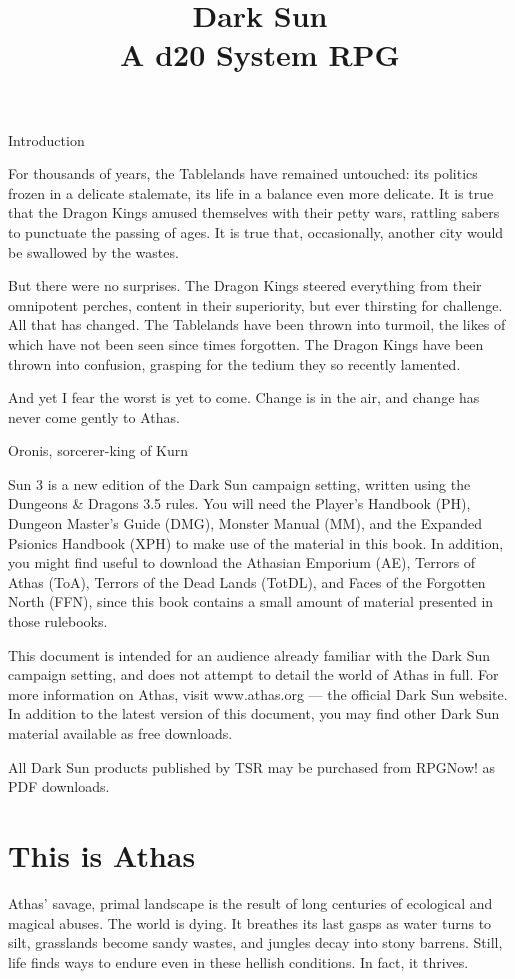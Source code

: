 \documentclass[10pt,a4paper,twocolumn]{d20}
\title{Dark Sun\\
  \large A d20 System RPG}
\begin{document}
\tableofcontents

\Chapter
{Introduction}
{For thousands of years, the Tablelands have remained untouched: its politics frozen in a delicate stalemate, its life in a balance even more delicate. It is true that the Dragon Kings amused themselves with their petty wars, rattling sabers to punctuate the passing of ages. It is true that, occasionally, another city would be swallowed by the wastes.

But there were no surprises. The Dragon Kings steered everything from their omnipotent perches, content in their superiority, but ever thirsting for challenge. All that has changed. The Tablelands have been thrown into turmoil, the likes of which have not been seen since times forgotten. The Dragon Kings have been thrown into confusion, grasping for the tedium they so recently lamented.

And yet I fear the worst is yet to come. Change is in the air, and change has never come gently to Athas.}{Oronis, sorcerer-king of Kurn}

 Sun 3 is a new edition of the Dark Sun campaign setting, written using the Dungeons \& Dragons 3.5 rules. You will need the Player’s Handbook (PH), Dungeon Master’s Guide (DMG), Monster Manual (MM), and the Expanded Psionics Handbook (XPH) to make use of the material in this book. In addition, you might find useful to download the Athasian Emporium (AE), Terrors of Athas (ToA), Terrors of the Dead Lands (TotDL), and Faces of the Forgotten North (FFN), since this book contains a small amount of material presented in those rulebooks.

This document is intended for an audience already familiar with the Dark Sun campaign setting, and does not attempt to detail the world of Athas in full. For more information on Athas, visit www.athas.org --- the official Dark Sun website. In addition to the latest version of this document, you may find other Dark Sun material available as free downloads.

All Dark Sun products published by TSR may be purchased from RPGNow! as PDF downloads.

\section{This is Athas}

Athas’ savage, primal landscape is the result of long centuries of ecological and magical abuses. The world is dying. It breathes its last gasps as water turns to silt, grasslands become sandy wastes, and jungles decay into stony barrens. Still, life finds ways to endure even in these hellish conditions. In fact, it thrives.
\end{document}
